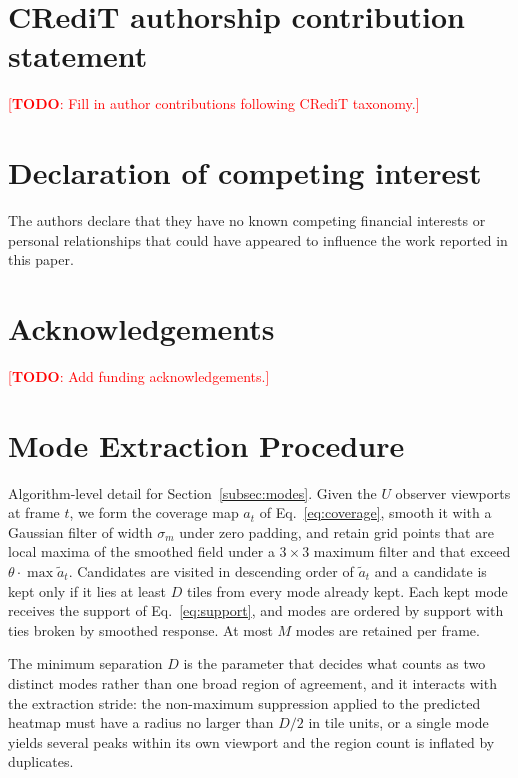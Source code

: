 \documentclass[preprint,12pt]{elsarticle}
\newcommand{\todo}[1]{\textcolor{red}{[\textbf{TODO}: #1]}}
\begin{document}

\section*{CRediT authorship contribution statement}
\todo{Fill in author contributions following CRediT taxonomy.}

\section*{Declaration of competing interest}
The authors declare that they have no known competing financial interests 
or personal relationships that could have appeared to influence the work 
reported in this paper.

\section*{Acknowledgements}
\todo{Add funding acknowledgements.}

\appendix

\section{Mode Extraction Procedure}
\label{app:modes}

Algorithm-level detail for Section~\ref{subsec:modes}. Given the $U$ observer
viewports at frame $t$, we form the coverage map $a_t$ of
Eq.~\ref{eq:coverage}, smooth it with a Gaussian filter of width $\sigma_m$
under zero padding, and retain grid points that are local maxima of the
smoothed field under a $3{\times}3$ maximum filter and that exceed
$\theta \cdot \max \tilde{a}_t$. Candidates are visited in descending order of
$\tilde{a}_t$ and a candidate is kept only if it lies at least $D$ tiles from
every mode already kept. Each kept mode receives the support of
Eq.~\ref{eq:support}, and modes are ordered by support with ties broken by
smoothed response. At most $M$ modes are retained per frame.

The minimum separation $D$ is the parameter that decides what counts as two
distinct modes rather than one broad region of agreement, and it interacts
with the extraction stride: the non-maximum suppression applied to the
predicted heatmap must have a radius no larger than $D/2$ in tile units, or a
single mode yields several peaks within its own viewport and the region count
is inflated by duplicates.
\end{document}
